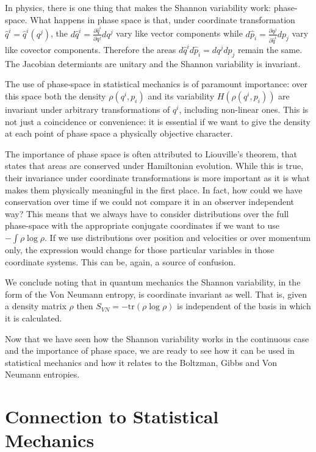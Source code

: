 \documentclass{article}
\begin{document}
In physics, there is one thing that makes the Shannon variability work: phase-space. What happens in phase space is that, under coordinate transformation $\hat{q}^i = \hat{q}^i(q^j)$, the $d\hat{q}^i = \frac{\partial \hat{q}^i}{\partial q^j } dq^j$ vary like vector components while $d\hat{p}_i = \frac{\partial q^j}{\partial \hat{q}^i } dp_j$ vary like covector components. Therefore the areas $d\hat{q}^i d\hat{p}_i = dq^j dp_j$ remain the same. The Jacobian determiants are unitary and the Shannon variability is invariant.

The use of phase-space in statistical mechanics is of paramount importance: over this space both the density $\rho(q^i, p
_i)$ and its variability $H(\rho(q^i, p
_i))$ are invariant under arbitrary transformations of $q^i$, including non-linear ones. This is not just a coincidence or convenience: it is essential if we want to give the density at each point of phase space a physically objective character.

The importance of phase space is often attributed to Liouville's theorem, that states that areas are conserved under Hamiltonian evolution. While this is true, their invariance under coordinate transformations is more important as it is what makes them physically meaningful in the first place. In fact, how could we have conservation over time if we could not compare it in an observer independent way? This means that we always have to consider distributions over the full phase-space with the appropriate conjugate coordinates if we want to use $-\int \rho \log \rho$. If we use distributions over position and velocities or over momentum only, the expression would change for those particular variables in those coordinate systems. This can be, again, a source of confusion.\cite{Dunkel}


We conclude noting that in quantum mechanics the Shannon variability, in the form of the Von Neumann entropy, is coordinate invariant as well. That is, given a density matrix $\rho$ then $S_{VN} = - \textrm{tr}(\rho \log \rho)$ is independent of the basis in which it is calculated.

Now that we have seen how the Shannon variability works in the continuous case and the importance of phase space, we are ready to see how it can be used in statistical mechanics and how it relates to the Boltzman, Gibbs and Von Neumann entropies.


\section{Connection to Statistical Mechanics\label{csm}}
\end{document}
